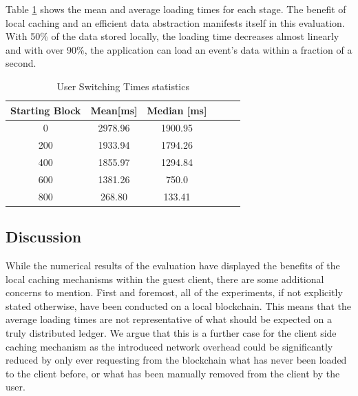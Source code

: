 Table \ref{tab:caching} shows the mean and average loading times for each stage. The benefit of local caching and an efficient data abstraction manifests itself in this evaluation. With 50\% of the data stored locally, the loading time decreases almost linearly and with over 90\%, the application can load an event's data within a fraction of a second.
 
\begin{table}[ht]
\centering
\begin{tabular}{|c|c|c|c|c|c|}
\hline
\textbf{Starting Block} & \textbf{Mean[ms]} & \textbf{Median [ms]} \\ \hline
0   & 2978.96         & 1900.95    \\ \hline
200 & 1933.94         &  1794.26   \\ \hline
400 & 1855.97         &  1294.84    \\ \hline
600 & 1381.26         &  750.0    \\ \hline
800 & 268.80          &  133.41     \\ \hline
\end{tabular}
\caption{User Switching Times statistics}
\label{tab:caching}
\end{table}

\subsection{Discussion}\label{section:eval-discussion}

While the numerical results of the evaluation have displayed the benefits of the local caching mechanisms within the guest client, there are some additional concerns to mention. First and foremost, all of the experiments, if not explicitly stated otherwise, have been conducted on a local blockchain. This means that the average loading times are not representative of what should be expected on a truly distributed ledger. We argue that this is a further case for the client side caching mechanism as the introduced network overhead could be significantly reduced by only ever requesting from the blockchain what has never been loaded to the client before, or what has been manually removed from the client by the user.  